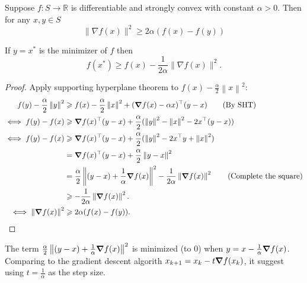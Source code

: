 \begin{theorem}\label{thm:lower_bound_gradient}
    Suppose $f: S \rightarrow \mathbb{R}$ is differentiable and strongly convex with constant $\alpha>0$. Then for any $x, y \in S$
    \[
    \|\nabla f(x)\|^2 \geq 2 \alpha(f(x)-f(y))
    \]
\end{theorem}
\begin{note}
    If $y=x^*$ is the minimizer of $f$ then
\[
f\left(x^*\right) \geq f(x)-\frac{1}{2 \alpha}\|\nabla f(x)\|^2 .
\]
\end{note}
\begin{proof}
    Apply supporting hyperplane theorem to $ f(x)-\frac{\alpha}{2} \left\| x \right\|^2 $: 
    \begin{align*}
        f(y) - \frac{\alpha}{2}\left\| y \right\|^2 &\geqslant f(x) - \frac{\alpha}{2} \left\| x \right\|^2 + (\grad f(x) - \alpha x)^\top (y-x)\tag{By SHT}\\ 
        \iff f(y)-f(x)&\geqslant \grad f(x)^\top(y-x) + \frac{\alpha}{2}(\left\| y \right\|^2 - \left\| x \right\|^2 - 2 x^\top(y-x))\\ 
        \iff f(y)-f(x)&\geqslant \grad f(x)^\top(y-x) + \frac{\alpha}{2}(\left\| y \right\|^2 - 2 x^\top y + \left\| x \right\|^2)\\ 
        &= \grad f(x)^\top(y-x) + \frac{\alpha}{2}\left\| y-x \right\|^2\\ 
        & = \frac{\alpha}{2}\left\| (y-x)+\frac{1}{\alpha}\grad f(x) \right\|^2-\frac{1}{2\alpha}\left\| \grad f(x) \right\|^2 \tag{Complete the square}\\ 
        &\geqslant -\frac{1}{2\alpha}\left\| \grad f(x) \right\|^2.\\
        \iff \left\| \grad f(x) \right\|^2 &\geqslant 2\alpha (f(x)-f(y)).\qedhere
    \end{align*}
\end{proof}
\begin{remark}
    The term $ \frac{\alpha}{2}\left\| (y-x)+\frac{1}{\alpha}\grad f(x) \right\|^2 $ is minimized (to 0) when $ y = x - \frac{1}{\alpha} \grad f(x) $. Comparing to the gradient descent algorith $ x_{k+1} = x_k - t \grad f(x_k) $, it suggest using $ t = \frac{1}{\alpha} $ as the step size. 
\end{remark}
\newpage